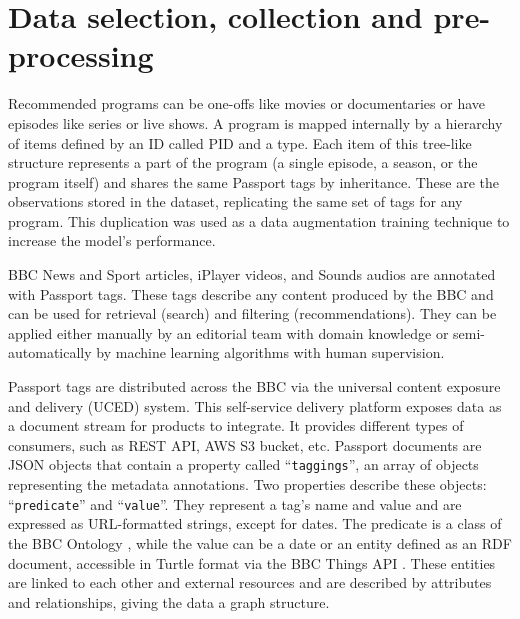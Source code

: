 
\section{Data selection, collection and pre-processing}


Recommended programs can be one-offs like movies or documentaries or have episodes like series or live shows.
A program is mapped internally by a hierarchy of items defined by an ID called PID and a type.
Each item of this tree-like structure represents a part of the program
(a single episode, a season, or the program itself) and shares the same Passport tags by inheritance.
These are the observations stored in the dataset, replicating the same set of tags for any program.
This duplication was used as a data augmentation training technique to increase the model's performance.

BBC News and Sport articles, iPlayer videos, and Sounds audios are annotated with Passport tags.
These tags describe any content produced by the BBC and can be used for retrieval (search) and filtering (recommendations).
They can be applied either manually by an editorial team with domain knowledge
or semi-automatically by machine learning algorithms with human supervision.

Passport tags are distributed across the BBC via the universal content exposure and delivery (UCED) system.
This self-service delivery platform exposes data as a document stream for products to integrate.
It provides different types of consumers, such as REST API, AWS S3 bucket, etc.
Passport documents are JSON objects that contain a property called ``\verb|taggings|'', an array of objects representing the
metadata annotations. Two properties describe these objects: ``\verb|predicate|'' and ``\verb|value|''.
They represent a tag's name and value and are expressed as URL-formatted strings, except for dates.
The predicate is a class of the BBC Ontology \cite{BBC:Ontologies},
while the value can be a date or an entity defined as an RDF \cite{W3C:RDF,W3C:RDF:Concepts} document,
accessible in Turtle format \cite{W3C:Turtle} via the BBC Things API \cite{BBC:Things,BBC:Things:About,BBC:Things:API}.
These entities are linked to each other and external resources and are described by attributes and relationships,
giving the data a graph structure.

